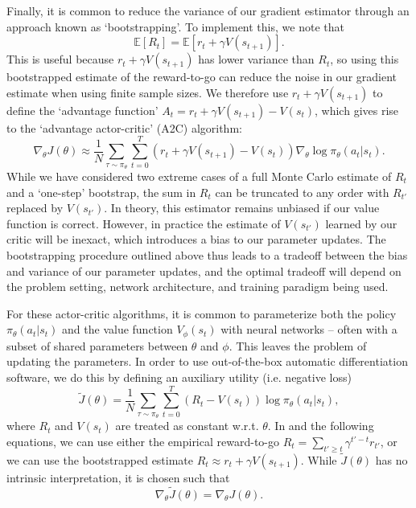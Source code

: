 Finally, it is common to reduce the variance of our gradient estimator through an approach known as `bootstrapping'.
To implement this, we note that
\begin{equation}
    \mathbb{E} \left [ R_t \right ] = \mathbb{E}[r_t + \gamma V(s_{t+1})].
\end{equation}
This is useful because $r_t + \gamma V(s_{t+1})$ has lower variance than $R_t$, so using this bootstrapped estimate of the reward-to-go can reduce the noise in our gradient estimate when using finite sample sizes.
We therefore use $r_t + \gamma V(s_{t+1})$ to define the `advantage function' $A_t = r_t + \gamma V(s_{t+1}) - V(s_t)$, which gives rise to the `advantage actor-critic' (A2C) algorithm:
\begin{equation}
    \nabla_\theta J(\theta) \approx \frac{1}{N} \sum_{\tau \sim \pi_\theta}  \sum_{t=0}^T (r_t + \gamma V(s_{t+1}) - V(s_t)) \nabla_\theta \log \pi_\theta (a_t|s_t).
\end{equation}
While we have considered two extreme cases of a full Monte Carlo estimate of $R_t$ and a `one-step' bootstrap, the sum in $R_t$ can be truncated to any order with $R_{t'}$ replaced by $V(s_{t'})$.
In theory, this estimator remains unbiased if our value function is correct.
However, in practice the estimate of $V(s_{t'})$ learned by our critic will be inexact, which introduces a bias to our parameter updates.
The bootstrapping procedure outlined above thus leads to a tradeoff between the bias and variance of our parameter updates, and the optimal tradeoff will depend on the problem setting, network architecture, and training paradigm being used.

For these actor-critic algorithms, it is common to parameterize both the policy $\pi_\theta(a_t|s_t)$ and the value function $V_\phi(s_t)$ with neural networks -- often with a subset of shared parameters between $\theta$ and $\phi$.
This leaves the problem of updating the parameters.
In order to use out-of-the-box automatic differentiation software, we do this by defining an auxiliary utility (i.e. negative loss)
\begin{equation}
    \label{eq:Jtilde}
    \tilde{J}(\theta) = \frac{1}{N} \sum_{\tau \sim \pi_\theta}  \sum_{t=0}^T (R_t - V(s_t)) \log \pi_\theta (a_t|s_t),
\end{equation}
where $R_t$ and $V(s_t)$ are treated as constant w.r.t. $\theta$.
In  and the following equations, we can use either the empirical reward-to-go $R_t = \sum_{t' \geq t} \gamma^{t'-t} r_{t'}$, or we can use the bootstrapped estimate $R_t \approx r_t + \gamma V(s_{t+1})$.
While $\tilde{J}(\theta)$ has no intrinsic interpretation, it is chosen such that
\begin{equation}
    \nabla_\theta \tilde{J}(\theta) = \nabla_\theta J(\theta).
\end{equation}

